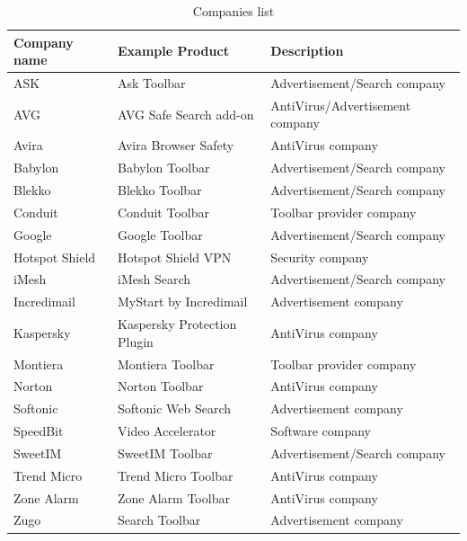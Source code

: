\documentclass[11pt,oneside]{book}
\begin{document}
\begin{table}[!htbp]
\centering
\caption{Companies list}
\label{table:companies_list}
\begin{tabular}{@{}lll@{}}
\toprule
{\bf Company name} & {\bf Example Product}               & {\bf Description}               \\ \midrule
ASK                & Ask Toolbar                 & Advertisement/Search company    \\
AVG                & AVG Safe Search add-on      & AntiVirus/Advertisement company \\
Avira              & Avira Browser Safety        & AntiVirus company               \\
Babylon            & Babylon Toolbar             & Advertisement/Search company    \\
Blekko             & Blekko Toolbar              & Advertisement/Search company    \\
Conduit            & Conduit Toolbar             & Toolbar provider company        \\
Google             & Google Toolbar              & Advertisement/Search company    \\
Hotspot Shield     & Hotspot Shield VPN          & Security company                \\
iMesh              & iMesh Search                & Advertisement/Search company    \\
Incredimail        & MyStart by Incredimail      & Advertisement company           \\
Kaspersky          & Kaspersky Protection Plugin & AntiVirus company               \\
Montiera           & Montiera Toolbar            & Toolbar provider company        \\
Norton             & Norton Toolbar              & AntiVirus company               \\
Softonic           & Softonic Web Search         & Advertisement company           \\
SpeedBit           & Video Accelerator           & Software company                \\
SweetIM            & SweetIM Toolbar             & Advertisement/Search company    \\
Trend Micro        & Trend Micro Toolbar         & AntiVirus company               \\
Zone Alarm         & Zone Alarm Toolbar          & AntiVirus company               \\ 
Zugo               & Search Toolbar              & Advertisement company           \\ \bottomrule
\end{tabular}
\end{table}
\end{document}
